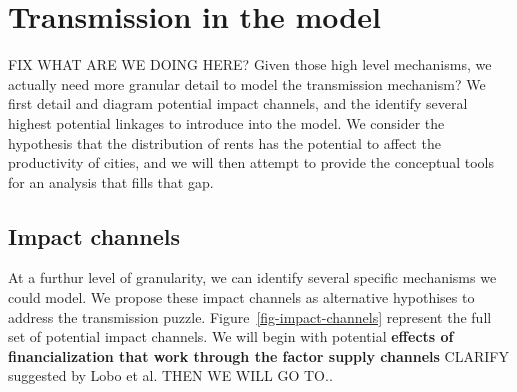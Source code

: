 



\section{Transmission in the model}

FIX WHAT ARE WE DOING HERE?
Given those high level mechanisms, we actually need more granular detail to model the transmission mechanism? We first detail and diagram potential impact channels, and the identify several highest potential linkages to introduce into the model. 
We consider the hypothesis that the distribution of rents has the potential to affect the productivity of cities, and we will then attempt to provide the conceptual tools for an analysis that fills that gap.

\subsection{Impact channels}

At a furthur level of granularity, we can identify several specific mechanisms we could model. We propose these \gls{impact channels} as alternative hypothises to address \gls{the transmission puzzle}. Figure~\ref{fig-impact-channels} represent the full set of potential impact channels.
We will begin with potential \textbf{effects of financialization  that work through the factor supply channels} CLARIFY suggested by Lobo et al. 
THEN WE WILL GO TO..

